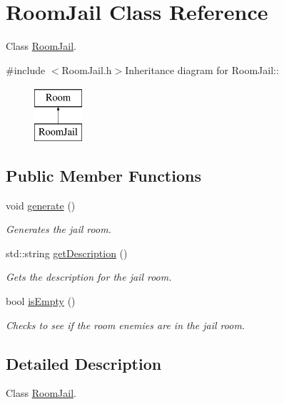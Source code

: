 \hypertarget{classRoomJail}{
\section{RoomJail Class Reference}
\label{classRoomJail}
}


Class \hyperlink{classRoomJail}{RoomJail}.  


{\ttfamily \#include $<$RoomJail.h$>$}Inheritance diagram for RoomJail::\begin{figure}[H]
\begin{center}
\leavevmode
\includegraphics[height=2cm]{classRoomJail}
\end{center}
\end{figure}
\subsection*{Public Member Functions}
\begin{DoxyCompactItemize}
\item 
void \hyperlink{classRoomJail_ae0c2bba84e14c607af53a55b3e4d1810}{generate} ()
\begin{DoxyCompactList}\small\item\em Generates the jail room. \item\end{DoxyCompactList}\item 
std::string \hyperlink{classRoomJail_a4f33dd7e286e3505b622d97b30616d28}{getDescription} ()
\begin{DoxyCompactList}\small\item\em Gets the description for the jail room. \item\end{DoxyCompactList}\item 
bool \hyperlink{classRoomJail_a33860dcae7024da01ab1063bc4b1db0d}{isEmpty} ()
\begin{DoxyCompactList}\small\item\em Checks to see if the room enemies are in the jail room. \item\end{DoxyCompactList}\end{DoxyCompactItemize}


\subsection{Detailed Description}
Class \hyperlink{classRoomJail}{RoomJail}. 

